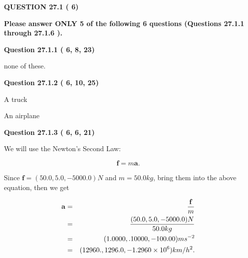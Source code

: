 \documentclass[12pt]{article}
\begin{document}
{\textbf{\Large{QUESTION
27.1 
 (          6)
}}}
  
  
{\textbf{\Large{Please answer ONLY  %
           5 %
 of the following  %
           6 %
 questions (Questions  %
27.1.1 %
 through  %
27.1.6 %
 ). }}}
   
   
  
\vspace{0.2in}
  
{\textbf{\Large{Question
27.1.1 
 (          6,          8,         23)
}}}
  
  
 
 
\noindent{}
 
 
none of these.
 
 
 
 
  
\vspace{0.2in}
  
{\textbf{\Large{Question
27.1.2 
 (          6,         10,         25)
}}}
  
  
 
 
\noindent{}
 
 
A truck
 
 
An airplane
 
 
 
 
  
\vspace{0.2in}
  
{\textbf{\Large{Question
27.1.3 
 (          6,          6,         21)
}}}
  
  
 
 
\noindent{}

We will use the Newton's Second Law:
 
\[
\mathbf{f}=m\mathbf{a}.
\]
 
Since $\mathbf{f}=( %
50.0,  %
5.0,  %
-5000.0 )N$
and $m= %
50.0 kg$, bring them into the above equation, then we get
 
\begin{eqnarray*}
\mathbf{a}&=&\frac{\mathbf{f}}m  \\
&=&\frac{(
50.0 ,
5.0 ,
-5000.0 )N
}{ %
50.0 kg}  \\
&=&(
1.0000 ,
.10000,
-100.00
)ms^{-2} \\
&=&(
12960. ,
1296.0 ,
-1.2960 \times 10^{6}
)km/h^2.
\end{eqnarray*}
 
\end{document}
